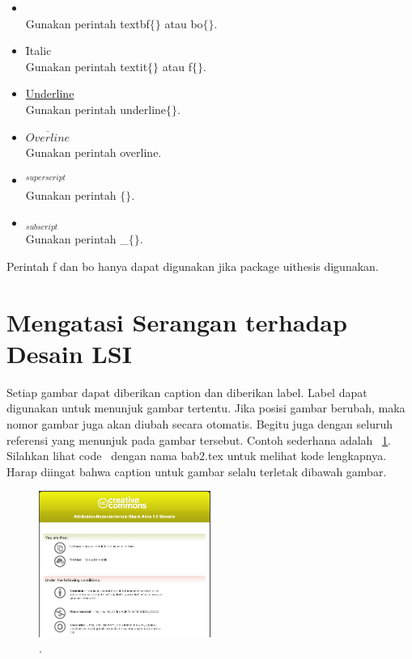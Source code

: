 \begin{itemize}
	\item {} \\
		Gunakan perintah \bslash textbf$\lbrace\rbrace$ atau 
		\bslash bo$\lbrace\rbrace$. 
	\item \f{Italic} \\
		Gunakan perintah \bslash textit$\lbrace\rbrace$ atau 
		\bslash f$\lbrace\rbrace$. 
	\item \underline{Underline} \\
		Gunakan perintah \bslash underline$\lbrace\rbrace$.
	\item $\overline{Overline}$ \\
		Gunakan perintah \bslash overline. 
	\item $^{superscript}$ \\
		Gunakan perintah \bslash $\lbrace\rbrace$. 
	\item $_{subscript}$ \\
		Gunakan perintah \bslash \_$\lbrace\rbrace$. 
\end{itemize}

Perintah \bslash f dan \bslash bo hanya dapat digunakan jika package 
uithesis digunakan. 

\section{Mengatasi Serangan terhadap Desain LSI}

Setiap gambar dapat diberikan caption dan diberikan label. Label dapat digunakan untuk menunjuk gambar tertentu.  Jika posisi gambar berubah, maka nomor gambar juga akan diubah secara otomatis. Begitu juga dengan seluruh referensi yang menunjuk pada gambar tersebut. Contoh sederhana adalah \pic~\ref{fig:testGambar}. Silahkan lihat code \latex~dengan nama bab2.tex untuk melihat kode lengkapnya. Harap diingat bahwa caption untuk gambar selalu terletak dibawah gambar.

\begin{figure}
	\centering
	\includegraphics[width=0.50\textwidth]
		{pics/creative_common.png}
	\caption{\license.}
	\label{fig:testGambar}
\end{figure}

